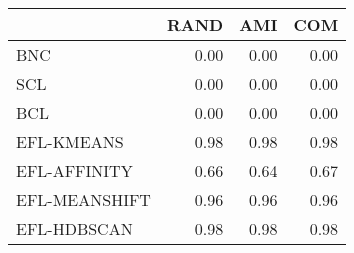 \begin{tabular}{lrrr}
\toprule
 & RAND & AMI & COM \\
\midrule
BNC & 0.00 & 0.00 & 0.00 \\
SCL & 0.00 & 0.00 & 0.00 \\
BCL & 0.00 & 0.00 & 0.00 \\
EFL-KMEANS & 0.98 & 0.98 & 0.98 \\
EFL-AFFINITY & 0.66 & 0.64 & 0.67 \\
EFL-MEANSHIFT & 0.96 & 0.96 & 0.96 \\
EFL-HDBSCAN & 0.98 & 0.98 & 0.98 \\
\bottomrule
\end{tabular}
